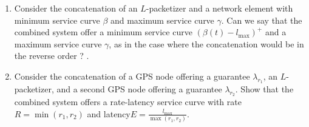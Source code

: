  \begin{problem}
\begin{enumerate}
  \item
 Consider the concatenation of an $L$-packetizer and a network
 element with minimum service curve $\beta$ and maximum service
 curve $\gamma$. Can we say that the combined system offer a
 minimum service curve $(\beta(t)-l_{\max})^+$ and a maximum service
 curve $\gamma$, as in the case where the concatenation would be
 in the reverse order ? .
  \item Consider the concatenation of a GPS node offering a guarantee
  $\lambda_{r_1}$, an $L$-packetizer, and a second GPS node offering a guarantee
  $\lambda_{r_2}$. Show that the combined system offers a rate-latency
  service curve with rate $R=\min(r_1, r_2)$ and
  latency$E=\frac{l_{\max}}{\max(r_1, r_2)}$.
\end{enumerate}
 \end{problem}
 
